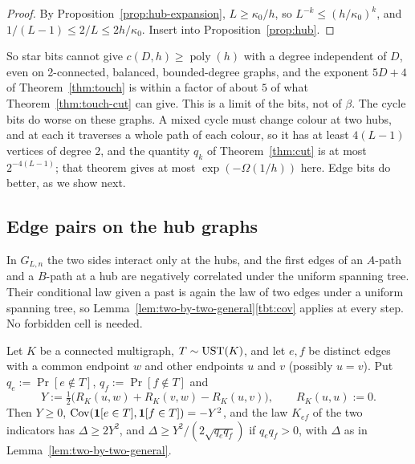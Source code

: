 \begin{proof}
By Proposition~\ref{prop:hub-expansion}, $L\ge\kappa_0/h$, so $L^{-k}\le(h/\kappa_0)^k$, and $1/(L-1)\le2/L\le2h/\kappa_0$. Insert into Proposition~\ref{prop:hub}.
\end{proof}

So star bits cannot give $c(D,h)\ge\operatorname{poly}(h)$ with a degree independent of $D$, even on 2-connected, balanced, bounded-degree graphs, and the exponent $5D+4$ of Theorem~\ref{thm:touch} is within a factor of about $5$ of what Theorem~\ref{thm:touch-cut} can give. This is a limit of the bits, not of $\beta$. The cycle bits do worse on these graphs. A mixed cycle must change colour at two hubs, and at each it traverses a whole path of each colour, so it has at least $4(L-1)$ vertices of degree $2$, and the quantity $q_k$ of Theorem~\ref{thm:cut} is at most $2^{-4(L-1)}$; that theorem gives at most $\exp(-\Omega(1/h))$ here. Edge bits do better, as we show next.

\subsection{Edge pairs on the hub graphs}\label{sec:edge-pairs}

In $G_{L,n}$ the two sides interact only at the hubs, and the first edges of an $A$-path and a $B$-path at a hub are negatively correlated under the uniform spanning tree. Their conditional law given a past is again the law of two edges under a uniform spanning tree, so Lemma~\ref{lem:two-by-two-general}\ref{tbt:cov} applies at every step. No forbidden cell is needed.

\begin{lemma}\label{lem:edge-pair-law}
Let $K$ be a connected multigraph, $T\sim\mathrm{UST}(K)$, and let $e,f$ be distinct edges with a common endpoint $w$ and other endpoints $u$ and $v$ (possibly $u=v$). Put $q_e:=\Pr[e\notin T]$, $q_f:=\Pr[f\notin T]$ and
\[
  Y:=\tfrac12\bigl(R_K(u,w)+R_K(v,w)-R_K(u,v)\bigr),\qquad R_K(u,u):=0 .
\]
Then $Y\ge0$, $\mathrm{Cov}(\mathbf{1}[e\in T],\mathbf{1}[f\in T])=-Y^2$, and the law $K_{ef}$ of the two indicators has $\Delta\ge2Y^2$, and $\Delta\ge Y^2/(2\sqrt{q_eq_f})$ if $q_eq_f>0$, with $\Delta$ as in Lemma~\ref{lem:two-by-two-general}.
\end{lemma}

